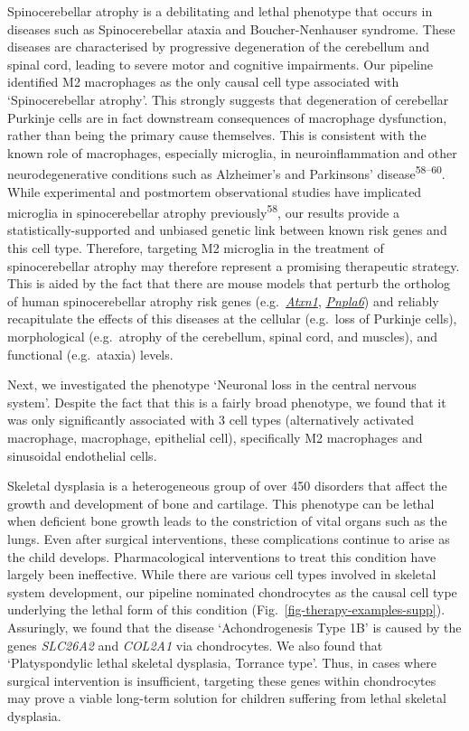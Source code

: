 \documentclass[
]{report}
\begin{document}
Spinocerebellar atrophy is a debilitating and lethal phenotype that
occurs in diseases such as Spinocerebellar ataxia and Boucher-Nenhauser
syndrome. These diseases are characterised by progressive degeneration
of the cerebellum and spinal cord, leading to severe motor and cognitive
impairments. Our pipeline identified M2 macrophages as the only causal
cell type associated with `Spinocerebellar atrophy'. This strongly
suggests that degeneration of cerebellar Purkinje cells are in fact
downstream consequences of macrophage dysfunction, rather than being the
primary cause themselves. This is consistent with the known role of
macrophages, especially microglia, in neuroinflammation and other
neurodegenerative conditions such as Alzheimer's and Parkinsons'
disease\textsuperscript{58--60}. While experimental and postmortem
observational studies have implicated microglia in spinocerebellar
atrophy previously\textsuperscript{58}, our results provide a
statistically-supported and unbiased genetic link between known risk
genes and this cell type. Therefore, targeting M2 microglia in the
treatment of spinocerebellar atrophy may therefore represent a promising
therapeutic strategy. This is aided by the fact that there are mouse
models that perturb the ortholog of human spinocerebellar atrophy risk
genes
(e.g.~\href{https://www.informatics.jax.org/marker/MGI:104783}{\emph{Atxn1}},
\href{https://www.informatics.jax.org/marker/MGI:1354723}{\emph{Pnpla6}})
and reliably recapitulate the effects of this diseases at the cellular
(e.g.~loss of Purkinje cells), morphological (e.g.~atrophy of the
cerebellum, spinal cord, and muscles), and functional (e.g.~ataxia)
levels.

Next, we investigated the phenotype `Neuronal loss in the central
nervous system'. Despite the fact that this is a fairly broad phenotype,
we found that it was only significantly associated with 3 cell types
(alternatively activated macrophage, macrophage, epithelial cell),
specifically M2 macrophages and sinusoidal endothelial cells.

Skeletal dysplasia is a heterogeneous group of over 450 disorders that
affect the growth and development of bone and cartilage. This phenotype
can be lethal when deficient bone growth leads to the constriction of
vital organs such as the lungs. Even after surgical interventions, these
complications continue to arise as the child develops. Pharmacological
interventions to treat this condition have largely been ineffective.
While there are various cell types involved in skeletal system
development, our pipeline nominated chondrocytes as the causal cell type
underlying the lethal form of this condition
(Fig.~\ref{fig-therapy-examples-supp}). Assuringly, we found that the
disease `Achondrogenesis Type 1B' is caused by the genes \emph{SLC26A2}
and \emph{COL2A1} via chondrocytes. We also found that `Platyspondylic
lethal skeletal dysplasia, Torrance type'. Thus, in cases where surgical
intervention is insufficient, targeting these genes within chondrocytes
may prove a viable long-term solution for children suffering from lethal
skeletal dysplasia.
\end{document}
